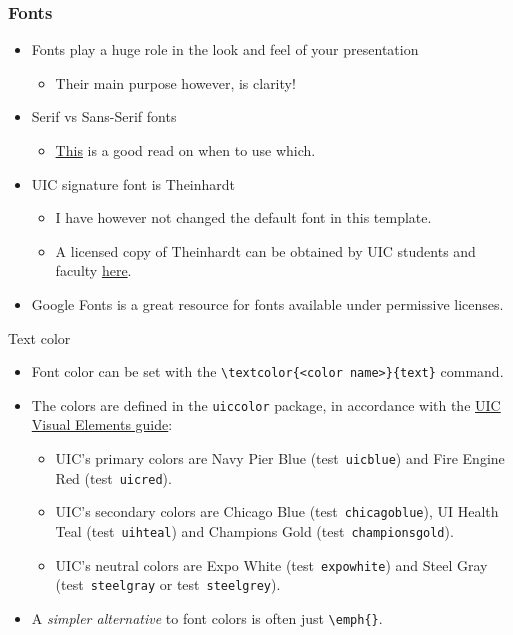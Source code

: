 \documentclass{beamer}
\newcommand{\hrefcol}[2]{\textcolor{uihteal}{\href{#1}{#2}}}
\newcommand{\testcolor}[1]{\colorbox{#1}{\textcolor{#1}{test}}~\texttt{#1}}
\begin{document}
\begin{frame}
\frametitle{Fonts}
\begin{itemize}
\item Fonts play a huge role in the look and feel of your presentation
  \begin{itemize}
  \item Their main purpose however, is clarity!
  \end{itemize}
\item \textrm{Serif} vs \textsf{Sans-Serif} fonts
  \begin{itemize}
  \item \hrefcol{https://www.adobe.com/creativecloud/design/discover/serif-vs-sans-serif.html}{This} is a good read on when to use which.
  \end{itemize}
\item UIC signature font is Theinhardt
  \begin{itemize}
  \item I have however not changed the default font in this template.
  \item A licensed copy of Theinhardt can be obtained by UIC students and faculty \hrefcol{https://marketing.uic.edu/marketing-toolbox/uic-fonts/}{here}.
  \end{itemize}
\item Google Fonts is a great resource for fonts available under permissive licenses.
\end{itemize}
\end{frame}


\begin{frame}[fragile]{Text color}
\begin{itemize}
\item Font color can be set with the \verb|\textcolor{<color name>}{text}| command.
\item The colors are defined in the \texttt{uiccolor} package, in accordance with the \hrefcol{https://marketing.uic.edu/marketing-toolbox/university-style-guide/visual-elements/}{UIC Visual Elements guide}:
  \begin{itemize}
  \item UIC's primary colors are Navy Pier Blue (\testcolor{uicblue}) and Fire Engine Red (\testcolor{uicred}).
  \item UIC's secondary colors are Chicago Blue (\testcolor{chicagoblue}), UI Health Teal (\testcolor{uihteal}) and Champions Gold (\testcolor{championsgold}).
  \item UIC's neutral colors are Expo White (\testcolor{expowhite}) and Steel Gray (\testcolor{steelgray} or \testcolor{steelgrey}).
  \end{itemize}
\item A \emph{simpler alternative} to font colors is often just \verb|\emph{}|.
\end{itemize}
\end{frame}
\end{document}
